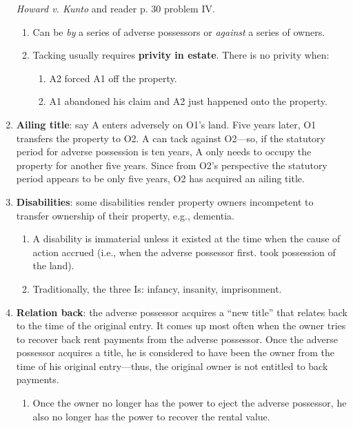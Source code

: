 \begin{enumerate}
{    \emph{Howard v. Kunto} and reader p. 30 problem IV.}
    \begin{enumerate}
        \item Can be \emph{by} a series of adverse possessors or \emph{against} 
        a series of owners.
        \item Tacking usually requires \textbf{privity in estate}. There is no 
        privity when:
        \begin{enumerate}
            \item A2 forced A1 off the property.
            \item A1 abandoned his claim and A2 just happened onto the 
            property.
        \end{enumerate}
    \end{enumerate}
    \item \textbf{Ailing title}: say A enters adversely on O1's land. Five 
    years later, O1 transfers the property to O2. A can tack against O2---so, if 
    the statutory period for adverse possession is ten years, A only needs to 
    occupy the property for another five years. Since from O2's perspective the 
    statutory period appears to be only five years, O2 has acquired an ailing 
    title.
    \item \textbf{Disabilities}: some disabilities render property owners 
    incompetent to transfer ownership of their property, e.g., dementia.
    \begin{enumerate}
        \item A disability is immaterial unless it existed at the time when 
        the cause of action accrued (i.e., when the adverse possessor first.
        took possession of the land).
        \item Traditionally, the three Is: infancy, insanity, imprisonment.
    \end{enumerate}
    \item \textbf{Relation back}: the adverse possessor acquires a ``new title'' 
    that relates back to the time of the original entry. It comes up most often 
    when the owner tries to recover back rent payments from the adverse 
    possessor. Once the adverse possessor acquires a title, he is considered to 
    have been the owner from the time of his original entry---thus, the original 
    owner is not entitled to back payments.
    \begin{enumerate}
        \item Once the owner no longer has the power to eject the adverse 
        possessor, he also no longer has the power to recover the rental value.

\end{enumerate}
\end{enumerate}
